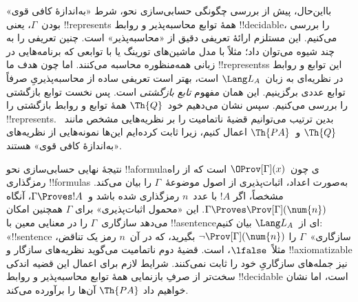 \documentclass[../../../include/open-logic-section]{subfiles}
\begin{document}
بااین‌حال، پیش از بررسی چگونگی حسابی‌سازی نحو، شرط «به‌اندازهٔ کافی
قوی» بودن~$\Gamma$، یعنی !!{represents} همهٔ توابع محاسبه‌پذیر و روابط
!!{decidable}، را بررسی می‌کنیم. این مستلزم ارائهٔ تعریفی دقیق از
«محاسبه‌پذیر» است. چنین تعریفی را به چند شیوه می‌توان داد؛ مثلاً با
مدل ماشین‌های تورینگ یا با توابعی که برنامه‌هایی در زبانی
همه‌منظوره محاسبه می‌کنند. اما چون هدف ما !!{represents}s این توابع و
روابط در نظریه‌ای به زبان~$\Lang L_A$ است، بهتر است تعریفی ساده از
محاسبه‌پذیریِ صرفاً توابع عددی برگزینیم. این همان مفهوم \emph{تابع
بازگشتی} است. پس نخست توابع بازگشتی را بررسی می‌کنیم. سپس نشان
می‌دهیم خود~$\Th{Q}$ همهٔ توابع و روابط بازگشتی را !!{represents}. بدین ترتیب می‌توانیم قضیهٔ ناتمامیت را بر نظریه‌هایی مشخص
مانند~$\Th{Q}$ و~$\Th{PA}$ اعمال کنیم، زیرا ثابت کرده‌ایم این‌ها
نمونه‌هایی از نظریه‌های «به‌اندازهٔ کافی قوی» هستند.

نتیجهٔ نهایی حسابی‌سازی نحو !!a{formula}ی چون~$\OProv[\Gamma](x)$ است که
از راه رمزگذاری !!{formula}s به‌صورت اعداد، اثبات‌پذیری از اصول
موضوعهٔ~$\Gamma$ را بیان می‌کند. مشخصاً، اگر $!A$ با عدد~$n$ رمزگذاری
شده باشد و~$\Gamma\Proves !A$، آنگاه
$\Gamma\Proves\Prov[\Gamma](\num{n})$. این «محمول اثبات‌پذیری» برای
$\Gamma$ همچنین امکان می‌دهد سازگاری~$\Gamma$ را در معنایی معین با
!!a{sentence}ای از~$\Lang L_A$ بیان کنیم: «!!{sentence}ٔ سازگاری»~$\Gamma$ را
$\lnot\Prov[\Gamma](\num{n})$ بگیرید، که در آن~$n$ رمز یک تناقض،
مثلاً~$\lfalse$، است. قضیهٔ دوم ناتمامیت می‌گوید نظریه‌های سازگار و
!!{axiomatizable} نیز جمله‌های سازگاریِ خود را ثابت نمی‌کنند. شرایط
لازم برای اعمال این قضیه اندکی سخت‌تر از صرفِ بازنمایی همهٔ توابع
محاسبه‌پذیر و روابط !!{decidable} است، اما نشان خواهیم داد
$\Th{PA}$ آن‌ها را برآورده می‌کند.
\end{document}
